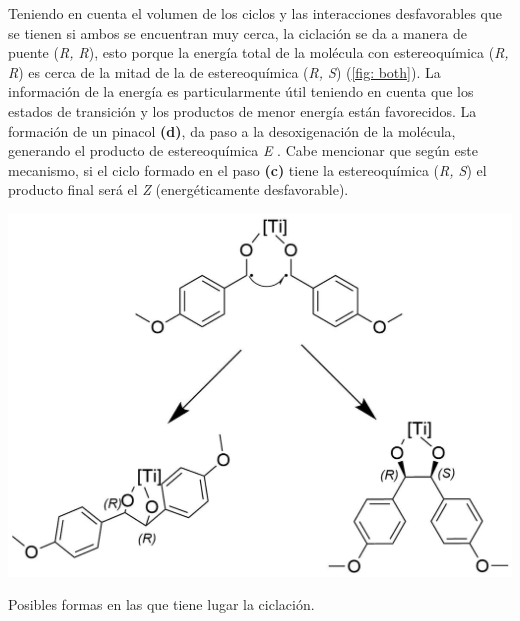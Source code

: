 \documentclass[fleqn,11pt]{SelfArx}
\begin{document}
Teniendo en cuenta el volumen de los ciclos y las interacciones desfavorables que se tienen si ambos se encuentran muy cerca, la ciclaci\'on se da a manera de puente (\textit{R, R}), esto porque la energ\'ia total de la mol\'ecula con estereoqu\'imica (\textit{R, R}) es cerca de la mitad de la de estereoqu\'imica (\textit{R, S}) (\autoref{fig: both}). La informaci\'on de la energ\'ia es particularmente útil teniendo en cuenta que los estados de transici\'on y los productos de menor energ\'ia est\'an favorecidos. La formaci\'on de un pinacol \textbf{(d)}, da paso a la desoxigenaci\'on de la mol\'ecula, generando el producto de estereoqu\'imica \textit{E} \cite{richards2001}. Cabe mencionar que seg\'un este mecanismo, si el ciclo formado en el paso \textbf{(c)} tiene la estereoqu\'imica (\textit{R, S}) el producto final ser\'a el \textit{Z} (energ\'eticamente desfavorable).
\begin{scheme}[h]
	\centering
	\includegraphics[width = 0.8\linewidth]{structures/EZdetermined.png}
	\caption{Posibles formas en las que tiene lugar la ciclaci\'on.}
	\label{sch: EZ}
\end{scheme}
\end{document}
